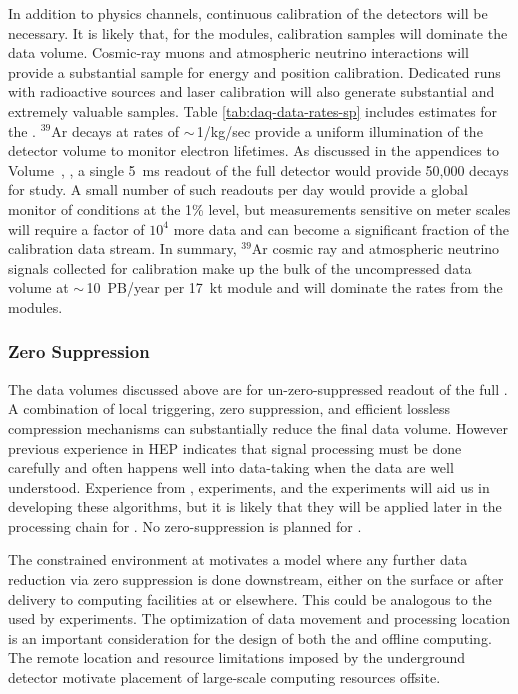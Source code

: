 In addition to physics channels, continuous calibration of the detectors will be necessary.  It is likely that, for the  modules, calibration samples will  dominate the data volume. Cosmic-ray muons and atmospheric neutrino interactions will provide a substantial sample for energy and position calibration.  Dedicated runs with radioactive sources and laser calibration will also generate substantial and extremely valuable samples. Table \ref{tab:daq-data-rates-sp} includes estimates for the %
. 
$^{39}$Ar decays at rates of $\sim\,$1/kg/sec provide a uniform illumination of the detector volume to monitor electron lifetimes. As discussed in the appendices to %
Volume~\volnumberphysics{}, \voltitlephysics{},  a single \SI{5}{ms} readout of the full detector would provide 50,000 decays for study.  A small number of such readouts per day would provide a global monitor of conditions at the 1\% level, but measurements sensitive on meter scales will require a factor of $10^4$ more data and can become a significant fraction of the calibration data stream. In summary, $^{39}$Ar cosmic ray and atmospheric neutrino signals collected for calibration make up the bulk of the uncompressed  data volume at $\sim\,$\SI{10}{PB/year} per \SI{17}{kt} module and will dominate the rates from the  modules.  


\subsubsection{Zero Suppression}

The data volumes discussed above are for un-zero-suppressed readout of the full . A combination of local triggering, zero suppression, and  efficient lossless compression mechanisms can substantially reduce the final data volume. However previous experience in HEP indicates that signal processing must be done carefully and often happens well into data-taking when the data are well understood. 
Experience from  ,  experiments, and the  experiments will aid us in developing these algorithms, but it is likely that they will be applied later in the processing chain for .  No zero-suppression is planned for .

The constrained environment at  motivates a model where any further data reduction via zero suppression is done downstream, either on the surface or after delivery to computing facilities at  or elsewhere. This could be analogous to the  used by  experiments.  The %
optimization of data movement and processing location is an important consideration for the design of both the  and offline computing. %
The remote location and resource limitations imposed by the underground detector motivate placement of large-scale computing resources offsite. 


